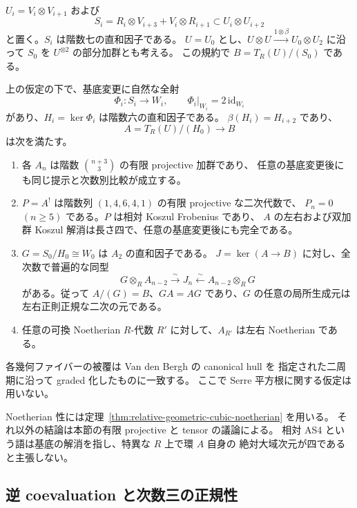 $U_i=V_i\otimes V_{i+1}$ および
\[
 S_i=R_i\otimes V_{i+3}+V_i\otimes R_{i+1}
       \subset U_i\otimes U_{i+2}
 \tag{UH-3}\label{hull-eq:relations}
\]
と置く。$S_i$ は階数七の直和因子である。
$U=U_0$ とし、$U\otimes U\xrightarrow{1\otimes\beta}U_0\otimes U_2$
に沿って $S_0$ を $U^{\otimes2}$ の部分加群とも考える。
この規約で $B=T_R(U)/(S_0)$ である。

\begin{theorem}
\label{thm:universal-cubic-hull}
上の仮定の下で、基底変更に自然な全射
\[
 \Phi_i:S_i\longrightarrow W_i,\qquad
 \Phi_i|_{W_i}=2\,\mathrm{id}_{W_i}
 \tag{UH-4}\label{hull-eq:Phi}
\]
があり、$H_i=\ker\Phi_i$ は階数六の直和因子である。
$\beta(H_i)=H_{i+2}$ であり、
\[
 A=T_R(U)/(H_0)\longrightarrow B
 \tag{UH-5}\label{hull-eq:hull}
\]
は次を満たす。
\begin{enumerate}
\item 各 $A_n$ は階数 $\binom{n+3}{3}$ の有限 projective 加群であり、
  任意の基底変更後にも同じ提示と次数別比較が成立する。
\item $P=A^!$ は階数列 $(1,4,6,4,1)$ の有限 projective な二次代数で、
  $P_n=0$ $(n\ge5)$ である。$P$ は相対 Koszul Frobenius であり、
  $A$ の左右および双加群 Koszul 解消は長さ四で、任意の基底変更後にも完全である。
\item $G=S_0/H_0\cong W_0$ は $A_2$ の直和因子である。
  $J=\ker(A\to B)$ に対し、全次数で普遍的な同型
  \[
   G\otimes_R A_{n-2}\xrightarrow{\sim}J_n
     \xleftarrow{\sim}A_{n-2}\otimes_R G
   \tag{UH-6}\label{hull-eq:regular-normal}
  \]
  がある。従って $A/(G)=B$、$GA=AG$ であり、$G$ の任意の局所生成元は
  左右正則正規な二次の元である。
\item 任意の可換 Noetherian $R$-代数 $R'$ に対して、$A_{R'}$ は左右 Noetherian である。
\end{enumerate}
各幾何ファイバーの被覆は Van den Bergh の canonical hull を
指定された二周期に沿って graded 化したものに一致する。
ここで Serre 平方根に関する仮定は用いない。
\end{theorem}

Noetherian 性には定理~\ref{thm:relative-geometric-cubic-noetherian} を用いる。
それ以外の結論は本節の有限 projective と tensor の議論による。
相対 AS4 という語は基底の解消を指し、特異な $R$ 上で環 $A$ 自身の
絶対大域次元が四であると主張しない。

\subsection{逆 coevaluation と次数三の正規性}

